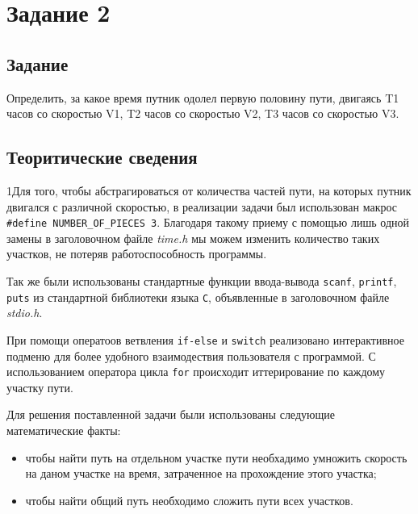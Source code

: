 \documentclass[12pt,a4paper]{report}
\begin{document}
\newpage

\section{Задание 2}
\subsection{Задание}
Определить, за какое время путник одолел первую половину пути, двигаясь T1 часов со скоростью V1, T2 часов со скоростью V2, T3 часов со скоростью V3.

\subsection{Теоритические сведения}
\hspace{\parindent}1Для того, чтобы абстрагироваться от количества частей пути, на которых путник двигался с различной скоростью, в реализации задачи был использован макрос \verb+#define NUMBER_OF_PIECES 3+. Благодаря такому приему с помощью лишь одной замены в заголовочном файле \textit{time.h} мы можем изменить количество таких участков, не потеряв работоспособность программы.

Так же были использованы стандартные функции ввода-вывода \texttt{scanf}, \texttt{printf}, \texttt{puts} из стандартной библиотеки языка \verb+С+, объявленные в заголовочном файле \textit{stdio.h}.

При помощи оператоов ветвления \texttt{if-else} и \texttt{switch} реализовано интерактивное подменю для более удобного взаимодествия пользователя с программой. С использованием оператора цикла \texttt{for} происходит иттерирование по каждому участку пути.

Для решения поставленной задачи были использованы следующие математические факты: 
\begin{itemize}
\item чтобы найти путь на отдельном участке пути необхадимо умножить скорость на даном участке на время, затраченное на прохождение этого участка;
\item чтобы найти общий путь необходимо сложить пути всех участков.
\end{itemize}
\end{document}
